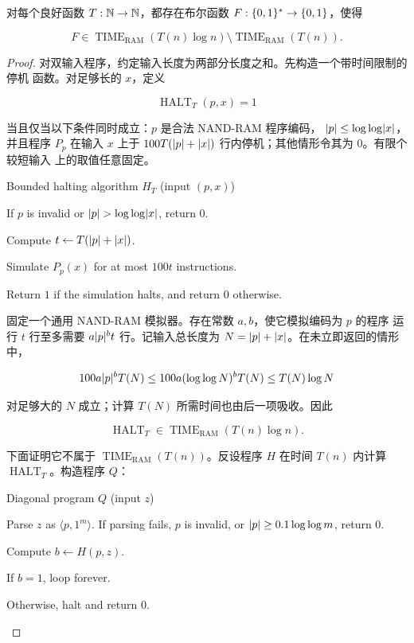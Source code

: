 \begin{theorem}
  \label{thm:time-hierarchy}
  对每个良好函数 $T:\mathbb{N}\to\mathbb{N}$，都存在布尔函数
  $F:\{0,1\}^{*}\to\{0,1\}$，使得

  \[
    F\in
    \operatorname{TIME}_{\mathrm{RAM}}(T(n)\log n)
    \setminus
    \operatorname{TIME}_{\mathrm{RAM}}(T(n)).
  \]
\end{theorem}

\begin{proof}
  对双输入程序，约定输入长度为两部分长度之和。先构造一个带时间限制的停机
  函数。对足够长的 $x$，定义

  \[
    \operatorname{HALT}_T(p,x)=1
  \]

  当且仅当以下条件同时成立：$p$ 是合法 NAND-RAM 程序编码，
  $\lvert p\rvert\leq\log\log\lvert x\rvert$，并且程序 $P_p$ 在输入 $x$ 上于
  $100T(\lvert p\rvert+\lvert x\rvert)$ 行内停机；其他情形令其为 $0$。有限个较短输入
  上的取值任意固定。

  \begin{pseudocode}{Bounded halting algorithm $H_T$ (input $(p,x)$)}
    \item If $p$ is invalid or $\lvert p\rvert>\log\log\lvert x\rvert$, return $0$.
    \item Compute $t\gets T(\lvert p\rvert+\lvert x\rvert)$.
    \item Simulate $P_p(x)$ for at most $100t$ instructions.
    \item Return $1$ if the simulation halts, and return $0$ otherwise.
  \end{pseudocode}

  固定一个通用 NAND-RAM 模拟器。存在常数 $a,b$，使它模拟编码为 $p$ 的程序
  运行 $t$ 行至多需要 $a\lvert p\rvert^{b}t$ 行。记输入总长度为
  $N=\lvert p\rvert+\lvert x\rvert$。在未立即返回的情形中，

  \[
    100a\lvert p\rvert^{b}T(N)
      \leq 100a(\log\log N)^bT(N)
      \leq T(N)\log N
  \]

  对足够大的 $N$ 成立；计算 $T(N)$ 所需时间也由后一项吸收。因此

  \[
    \operatorname{HALT}_T
      \in\operatorname{TIME}_{\mathrm{RAM}}(T(n)\log n).
  \]

  下面证明它不属于 $\operatorname{TIME}_{\mathrm{RAM}}(T(n))$。反设程序 $H$
  在时间 $T(n)$ 内计算 $\operatorname{HALT}_T$。构造程序 $Q$：

  \begin{pseudocode}{Diagonal program $Q$ (input $z$)}
    \item Parse $z$ as $\langle p,1^m\rangle$. If parsing fails, $p$ is
      invalid, or $\lvert p\rvert\geq 0.1\log\log m$, return $0$.
    \item Compute $b\gets H(p,z)$.
    \item If $b=1$, loop forever.
    \item Otherwise, halt and return $0$.
  \end{pseudocode}


\end{proof}
